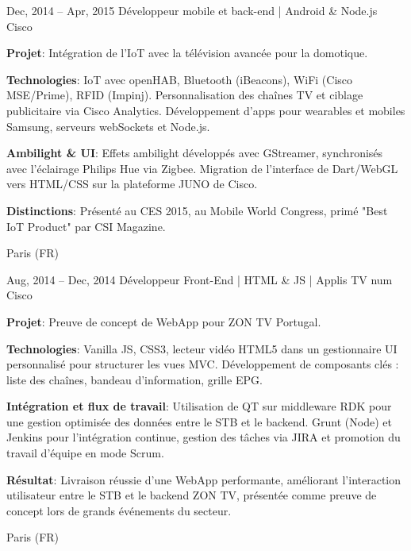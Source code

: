 \documentclass[
  a4paper,
   maincolor=cvblue,
   sectioncolor=cvblue,
   sidebarwidth=0.323\paperwidth,
]{fortysecondscv}
\begin{document}
\begin{cvtableNew}
  \cvitemRightNew
    {Dec, 2014 – Apr, 2015} %
    {Développeur mobile et back-end | Android \& Node.js} %
    {Cisco} %
    {
      \vspace{1pt} %
      \fontsize{10.8pt}{12pt}\selectfont %
      \textbf{Projet}: Intégration de l’IoT avec la télévision avancée pour la domotique.\par
      \vspace{4pt}
      \textbf{Technologies}: IoT avec openHAB, Bluetooth (iBeacons), WiFi (Cisco MSE/Prime), RFID (Impinj). Personnalisation des chaînes TV et ciblage publicitaire via Cisco Analytics. Développement d’apps pour wearables et mobiles Samsung, serveurs webSockets et Node.js.\par
      \vspace{4pt}
      \textbf{Ambilight \& UI}: Effets ambilight développés avec GStreamer, synchronisés avec l’éclairage Philips Hue via Zigbee. Migration de l’interface de Dart/WebGL vers HTML/CSS sur la plateforme JUNO de Cisco.\par
      \vspace{4pt}
      \textbf{Distinctions}: Présenté au CES 2015, au Mobile World Congress, primé "Best IoT Product" par CSI Magazine.\par
      \vspace{4pt} %
    }
    {Paris (FR)} %

    \vspace{1.16mm} %

    \cvitemRightNew
    {Aug, 2014 – Dec, 2014} %
    {Développeur Front-End | HTML \& JS | Applis TV num} %
    {Cisco} %
    {
      \vspace{1pt} %
      \fontsize{10.8pt}{12pt}\selectfont %
      \textbf{Projet}: Preuve de concept de WebApp pour ZON TV Portugal.\par
      \vspace{4pt}
      \textbf{Technologies}: Vanilla JS, CSS3, lecteur vidéo HTML5 dans un gestionnaire UI personnalisé pour structurer les vues MVC. Développement de composants clés : liste des chaînes, bandeau d’information, grille EPG.\par
      \vspace{4pt}
      \textbf{Intégration et flux de travail}: Utilisation de QT sur middleware RDK pour une gestion optimisée des données entre le STB et le backend. Grunt (Node) et Jenkins pour l’intégration continue, gestion des tâches via JIRA et promotion du travail d’équipe en mode Scrum.\par
      \vspace{4pt}
      \textbf{Résultat}: Livraison réussie d’une WebApp performante, améliorant l’interaction utilisateur entre le STB et le backend ZON TV, présentée comme preuve de concept lors de grands événements du secteur.
    }
    {Paris (FR)} %
\end{cvtableNew}
\end{document}
